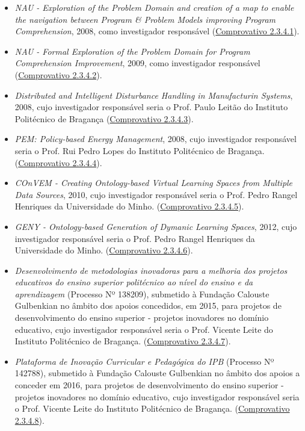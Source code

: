 \documentclass[11pt]{article}
\begin{document}
\begin{itemize}
\item {{\em{ NAU - Exploration of the Problem Domain and creation of a map to enable the navigation between Program \& Problem Models improving Program Comprehension}}, 2008, como investigador responsável (\href{run:Projectos/CandidaturasNaoAprovadas/NAU.pdf}{Comprovativo 2.3.4.1}).}
\item {{\em{ NAU - Formal Exploration of the Problem Domain for Program Comprehension Improvement}}, 2009, como investigador responsável (\href{run:Projectos/CandidaturasNaoAprovadas/NAU2.pdf}{Comprovativo 2.3.4.2}).}
\item {{\em{ Distributed and Intelligent Disturbance Handling in Manufacturin Systems}}, 2008, cujo investigador responsável seria o Prof. Paulo Leitão do Instituto Politécnico de Bragança (\href{run:Projectos/CandidaturasNaoAprovadas/PauloLeitao.pdf}{Comprovativo 2.3.4.3}).}
\item {{\em{ PEM: Policy-based Energy Management}}, 2008, cujo investigador responsável seria o Prof. Rui Pedro Lopes do Instituto Politécnico de Bragança. (\href{run:Projectos/CandidaturasNaoAprovadas/RuiPedro.pdf}{Comprovativo 2.3.4.4}).}
\item {{\em{ COnVEM - Creating Ontology-based Virtual Learning Spaces from Multiple Data Sources}}, 2010, cujo investigador responsável seria o Prof. Pedro Rangel Henriques da Universidade do Minho. (\href{run:Projectos/CandidaturasNaoAprovadas/convem2010.pdf}{Comprovativo 2.3.4.5}).}
\item {{\em{ GENY - Ontology-based Generation of Dymanic Learning Spaces}}, 2012, cujo investigador responsável seria o Prof. Pedro Rangel Henriques da Universidade do Minho. (\href{run:Projectos/CandidaturasNaoAprovadas/GENY2012.pdf}{Comprovativo 2.3.4.6}).}
\item {{\em{ Desenvolvimento de metodologias inovadoras para a melhoria dos projetos educativos do ensino superior politécnico ao nível do ensino e da aprendizagem}} (Processo Nº 138209), submetido à Fundação Calouste Gulbenkian no âmbito dos apoios concedidos, em 2015, para projetos de desenvolvimento do ensino superior - projetos inovadores no domínio educativo, cujo investigador responsável seria o Prof. Vicente Leite do Instituto Politécnico de Bragança. (\href{run:Projectos/CandidaturasNaoAprovadas/Gulbenkian2015.pdf}{Comprovativo 2.3.4.7}).}
\item {{\em{ Plataforma de Inovação Curricular e Pedagógica do IPB}} (Processo Nº 142788), submetido à Fundação Calouste Gulbenkian no âmbito dos apoios a conceder em 2016, para projetos de desenvolvimento do ensino superior - projetos inovadores no domínio educativo, cujo investigador responsável seria o Prof. Vicente Leite do Instituto Politécnico de Bragança. (\href{run:Projectos/CandidaturasNaoAprovadas/Gulbenkian2016.pdf}{Comprovativo 2.3.4.8}).}
\end{itemize}
\end{document}
